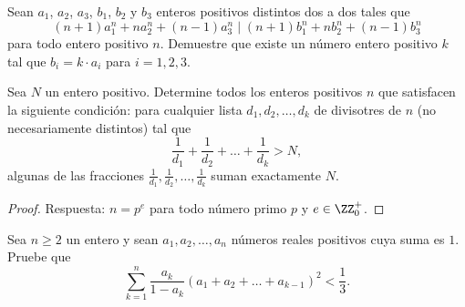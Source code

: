 \begin{probMR}
	Sean $a_1$, $a_2$, $a_3$, $b_1$, $b_2$ y $b_3$ enteros positivos distintos dos a dos tales que
	\[(n+1)a_1^n+na_2^n+(n-1)a_3^n\mid(n+1)b_1^n+nb_2^n+(n-1)b_3^n\]
	para todo entero positivo $n$. Demuestre que existe un número entero positivo $k$ tal que $b_i=k\cdot a_i$ para $i=1,2,3$.
\end{probMR}


\begin{probEG}
	Sea $N$ un entero positivo. Determine todos los enteros positivos $n$ que satisfacen la siguiente condición: para cualquier lista $d_1,d_2,\dots,d_k$ de divisotres de $n$ (no necesariamente distintos) tal que
	\[\frac{1}{d_1}+\frac{1}{d_2}+\dots+\frac{1}{d_k}>N,\]
	algunas de las fracciones $\frac{1}{d_1},\frac{1}{d_2},\dots,\frac{1}{d_k}$ suman exactamente $N$.
\end{probEG}

\begin{proof}
	Respuesta: $n=p^e$ para todo número primo $p$ y $e\in\ZZ^+_0$.
\end{proof}

\begin{probHR}
	Sea $n\ge 2$ un entero y sean $a_1,a_2,\dots,a_n$ números reales positivos cuya suma es $1$. Pruebe que
	\[\sum_{k=1}^n\frac{a_k}{1-a_k}(a_1+a_2+\dots+a_{k-1})^2<\frac13.\]
\end{probHR}

